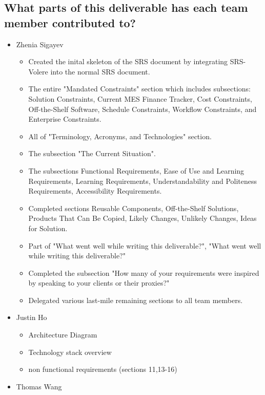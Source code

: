 \documentclass[12pt]{article}
\begin{document}
  \subsection{What parts of this deliverable has each team member contributed to?}
  \begin{itemize}
    \item Zhenia Sigayev
      \begin{itemize}[label=$\circ$]
        \item Created the inital skeleton of the SRS document by integrating SRS-Volere into the normal SRS document.
        \item The entire "Mandated Constraints" section which includes subsections: Solution Constraints, Current MES Finance Tracker, Cost Constraints, Off-the-Shelf Software, Schedule Constraints, Workflow Constraints, and Enterprise Constraints.
        \item All of "Terminology, Acronyms, and Technologies" section.
        \item The subsection "The Current Situation".
        \item The subsections Functional Requirements, Ease of Use and Learning Requirements, Learning Requirements, Understandability and Politeness Requirements, Accessibility Requirements.
        \item Completed sections Reusable Components, Off-the-Shelf Solutions, Products That Can Be Copied, Likely Changes, Unlikely Changes, Ideas for Solution.
        \item Part of "What went well while writing this deliverable?", "What went well while writing this deliverable?"
        \item Completed the subsection "How many of your requirements were inspired by speaking to your clients or their proxies?"
        \item Delegated various last-mile remaining sections to all team members.
      \end{itemize}
    \item Justin Ho
      \begin{itemize}[label=$\circ$]
        \item Architecture Diagram
        \item Technology stack overview
        \item non functional requirements (sections 11,13-16)
      \end{itemize}
    \item Thomas Wang
      \begin{itemize}[label=$\circ$]

\end{itemize}
\end{itemize}
\end{document}
